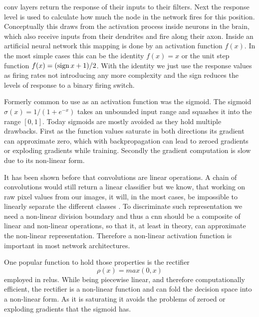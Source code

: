 \gls{conv} layers return the response of their inputs to their filters. Next the response level is used to calculate how much the node in the network fires for this position. Conceptually this draws from the activation process inside neurons in the brain, which also receive inputs from their dendrites and fire along their axon. Inside an artificial neural network this mapping is done by an activation function $f(x)$. In the most simple cases this can be the identity $f(x) = x$ or the unit step function $f(x) = (\operatorname{sign} x + 1) / 2$. With the identity we just use the response values as firing rates not introducing any more complexity and the sign reduces the levels of response to a binary firing switch.

Formerly common to use as an activation function was the sigmoid. The sigmoid $\sigma(x) = 1/(1+e^{-x})$  takes an unbounded input range and squashes it into the range $[0, 1]$. Today sigmoids are mostly avoided as they hold multiple drawbacks. First as the function values saturate in both directions its gradient can approximate zero, which with backpropagation can lead to zeroed gradients or exploding gradients while training. Secondly the gradient computation is slow due to its non-linear form.

It has been shown before that convolutions are linear operations. A chain of convolutions would still return a linear classifier but we know, that working on raw pixel values from our images, it will, in the most cases, be impossible to linearly separate the different classes \citep{lecun_deep_2015}. To discriminate such representation we need a non-linear division boundary and thus a \gls{cnn} should be a composite of linear and non-linear operations, so that it, at least in theory, can approximate the non-linear representation. Therefore a non-linear activation function is important in most network architectures.

One popular function to hold those properties is the rectifier
\begin{equation}
    \rho(x) = max(0, x)
\end{equation}
 employed in \glspl{relu}. While being piecewise linear, and therefore computationally efficient, the rectifier is a non-linear function and can fold the decision space into a non-linear form.  As it is saturating it avoids the problems of zeroed or exploding gradients that the sigmoid has.

